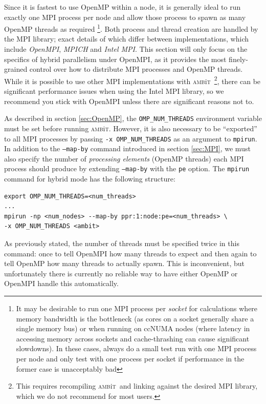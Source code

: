\documentclass{report}
\newcommand{\ambit}{\textsc{amb}{\footnotesize i}\textsc{t}}
\begin{document}
Since it is fastest to use OpenMP within a node, it is generally ideal to run exactly one MPI process per
node and allow those process to spawn as many OpenMP threads as required \footnote{It may be desirable 
to run one MPI process per \emph{socket} for calculations where memory bandwidth is the bottleneck (as 
cores on a socket generally share a single memory bus) or when running on ccNUMA nodes (where latency in
accessing memory across sockets and cache-thrashing can cause significant slowdowns). In these cases,
always do a small test run with one MPI process per node and only test with one process per socket if
performance in the former case is unacceptably bad}. Both process and thread
creation are handled by the MPI library; exact details of which differ between implementations, which 
include \textit{OpenMPI}, \textit{MPICH} and \textit{Intel MPI}. This section will only focus on the
specifics of hybrid parallelism under OpenMPI, as it provides the most finely-grained control over how to
distribute MPI processes and OpenMP threads. While it is possible to use other MPI implementations with
\ambit ~\footnote{This requires recompiling \ambit ~and linking against the desired MPI library, which we
do not recommend for most users.}, there can be significant performance issues when using the Intel MPI
library, so we recommend you stick with OpenMPI unless there are significant reasons not to.

As described in section \ref{sec:OpenMP}, the \texttt{OMP\_NUM\_THREADS}
environment variable must be set before running \ambit. However, it is also necessary to be ``exported''
to all MPI processes by passing \texttt{-x OMP\_NUM\_THREADS} as an argument to \texttt{mpirun}. In 
addition to the \texttt{--map-by} command introduced in section
\ref{sec:MPI}, we must also specify the number of \textit{processing elements} (OpenMP threads) each MPI 
process should produce by extending \texttt{--map-by} with the \texttt{pe} option. The \texttt{mpirun}
command for hybrid mode has the following structure:

\begin{verbatim}
export OMP_NUM_THREADS=<num_threads>
...
mpirun -np <num_nodes> --map-by ppr:1:node:pe=<num_threads> \
-x OMP_NUM_THREADS <ambit>
\end{verbatim}

As previously stated, the number of threads must be specified twice in this command: once to tell 
OpenMPI how many threads to expect and then again to tell OpenMP how many threads to actually spawn. This
is inconvenient, but unfortunately there is currently no reliable way to have either OpenMP or OpenMPI 
handle this automatically.
\end{document}
